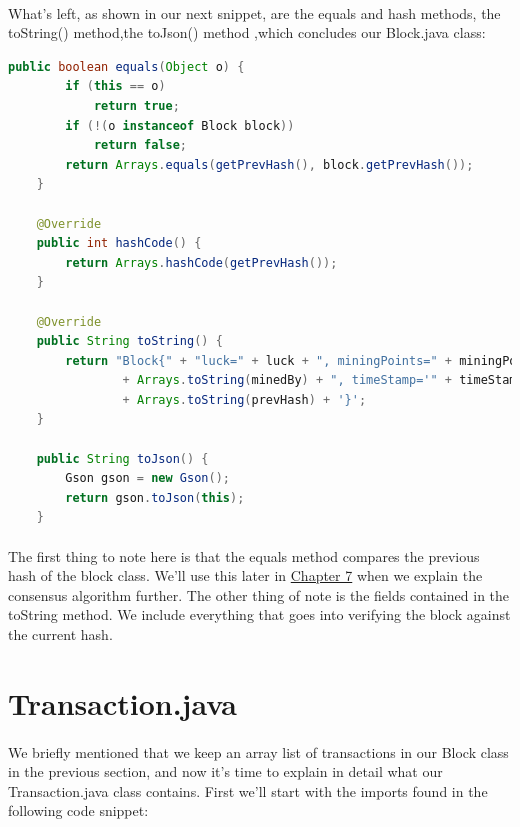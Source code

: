\documentclass[12pt,a4paper]{report}
\begin{document}
\paragraph{}
What’s left, as shown in our next snippet, are the equals and hash methods, the toString() method,the toJson() method ,which concludes our Block.java class:
\begin{lstlisting}[language=Java]
    public boolean equals(Object o) {
        if (this == o)
            return true;
        if (!(o instanceof Block block))
            return false;
        return Arrays.equals(getPrevHash(), block.getPrevHash());
    }

    @Override
    public int hashCode() {
        return Arrays.hashCode(getPrevHash());
    }

    @Override
    public String toString() {
        return "Block{" + "luck=" + luck + ", miningPoints=" + miningPoints + ", ledgerId=" + ledgerId + ", minedBy="
                + Arrays.toString(minedBy) + ", timeStamp='" + timeStamp + '\'' + ", prevHash="
                + Arrays.toString(prevHash) + '}';
    }

    public String toJson() {
        Gson gson = new Gson();
        return gson.toJson(this);
    }
\end{lstlisting}
\paragraph{}
The first thing to note here is that the equals method compares the previous hash of the block class. We’ll use this later in \hyperref[chapter Service Layer]{Chapter 7} when we explain the consensus algorithm further. The other thing of note is the fields contained in the toString method. We include everything that goes into verifying the block against the current hash.


 
\section{Transaction.java}
\paragraph{}
 We briefly mentioned that we keep an array list of transactions in our Block class in the previous section, and now it’s time to explain in detail what our Transaction.java class contains. First we’ll start with the imports found in the following code snippet:
 \paragraph{}
 
\end{document}

